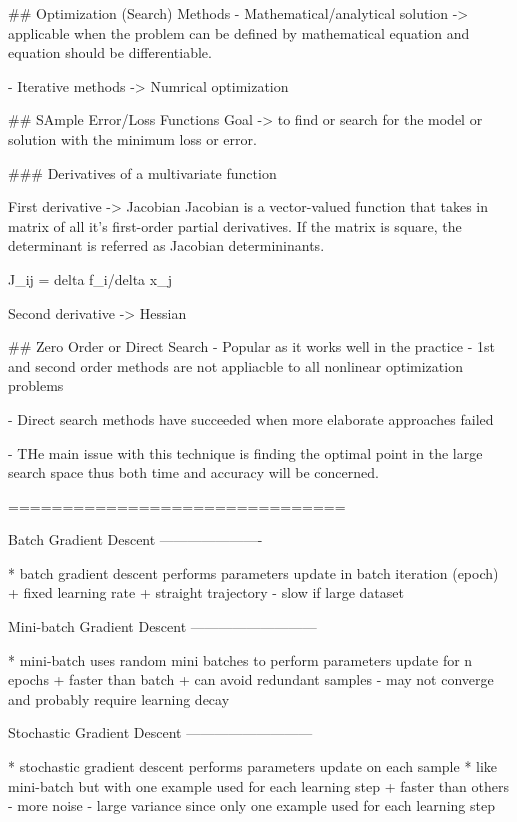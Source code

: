 ## Optimization (Search) Methods
- Mathematical/analytical solution -> applicable when the problem can be defined by mathematical equation and equation should be differentiable. 

- Iterative methods -> Numrical optimization

## SAmple Error/Loss Functions
Goal -> to find or search for the model or solution with the minimum loss or error. 

### Derivatives of a multivariate function


First derivative -> Jacobian
Jacobian is a vector-valued function that takes in matrix of all it's first-order partial derivatives.
If the matrix is square,  the determinant is referred as Jacobian determininants. 

J_ij = delta f_i/delta x_j

Second derivative -> Hessian

## Zero Order or Direct Search
- Popular as it works well in the practice
- 1st and second order methods are not appliacble to all
  nonlinear optimization problems

- Direct search methods have succeeded when more elaborate   
  approaches failed

- THe main issue with this technique is finding the optimal point in the large search space thus both time and accuracy will be concerned. 

===============================

Batch Gradient Descent
----------------------

* batch gradient descent performs parameters update in batch iteration (epoch)
+ fixed learning rate
+ straight trajectory
- slow if large dataset

Mini-batch Gradient Descent
---------------------------

* mini-batch uses random mini batches to perform parameters update for n epochs
+ faster than batch
+ can avoid redundant samples
- may not converge and probably require learning decay

Stochastic Gradient Descent
---------------------------

* stochastic gradient descent performs parameters update on each sample
* like mini-batch but with one example used for each learning step
+ faster than others
- more noise
- large variance since only one example used for each learning step



